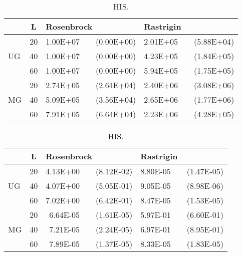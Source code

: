 \begin{table}[tbp]
\centering 
\caption{\aexpcontinuousnum HIS.}
\begin{tabular}{|lr|rr|rr|} \hline
\multicolumn{1}{|l|}{}&\multicolumn{1}{|c|}{L} & \multicolumn{2}{l|}{Rosenbrock} & \multicolumn{2}{l|}{Rastrigin} \\ \hline
\multicolumn{1}{|l|}{\multirow{3}{*}{UG}} & 20 & 1.00E+07 & ~~(0.00E+00) & 2.01E+05 & ~~(5.88E+04) \\ \cline{2-6}
\multicolumn{1}{|l|}{} & 40 & 1.00E+07 & ~~(0.00E+00) & 4.23E+05 & ~~(1.84E+05) \\ \cline{2-6}
\multicolumn{1}{|l|}{} & 60 & 1.00E+07 & ~~(0.00E+00) & 5.94E+05 & ~~(1.75E+05) \\ \hline
\multicolumn{1}{|l|}{\multirow{3}{*}{MG}} & 20 & 2.74E+05 & ~~(2.64E+04) & 2.40E+06 & ~~(3.08E+06) \\ \cline{2-6}
\multicolumn{1}{|l|}{} & 40 & 5.09E+05 & ~~(3.56E+04) & 2.65E+06 & ~~(1.77E+06) \\ \cline{2-6}
\multicolumn{1}{|l|}{} & 60 & 7.91E+05 & ~~(6.64E+04) & 2.23E+06 & ~~(4.28E+05) \\ \hline
\end{tabular}
\label{aexp-cont-eva-his}


\centering 
\caption{\aexpcontinuousval HIS.}
\begin{tabular}{|lr|rr|rr|} \hline
\multicolumn{1}{|l|}{}&\multicolumn{1}{|c|}{L} & \multicolumn{2}{l|}{Rosenbrock} & \multicolumn{2}{l|}{Rastrigin} \\ \hline
\multicolumn{1}{|l|}{\multirow{3}{*}{UG}} & 20 & 4.13E+00 & ~~(8.12E-02) & 8.80E-05 & ~~(1.47E-05) \\ \cline{2-6}
\multicolumn{1}{|l|}{} & 40 & 4.07E+00 & ~~(5.05E-01) & 9.05E-05 & ~~(8.98E-06) \\ \cline{2-6}
\multicolumn{1}{|l|}{} & 60 & 7.02E+00 & ~~(6.42E-01) & 8.47E-05 & ~~(1.53E-05) \\ \hline
\multicolumn{1}{|l|}{\multirow{3}{*}{MG}} & 20 & 6.64E-05 & ~~(1.61E-05) & 5.97E-01 & ~~(6.60E-01) \\ \cline{2-6}
\multicolumn{1}{|l|}{} & 40 & 7.21E-05 & ~~(2.24E-05) & 6.97E-01 & ~~(8.95E-01) \\ \cline{2-6}
\multicolumn{1}{|l|}{} & 60 & 7.89E-05 & ~~(1.37E-05) & 8.33E-05 & ~~(1.83E-05) \\ \hline
\end{tabular}
\label{aexp-cont-val-his}



\end{table}
